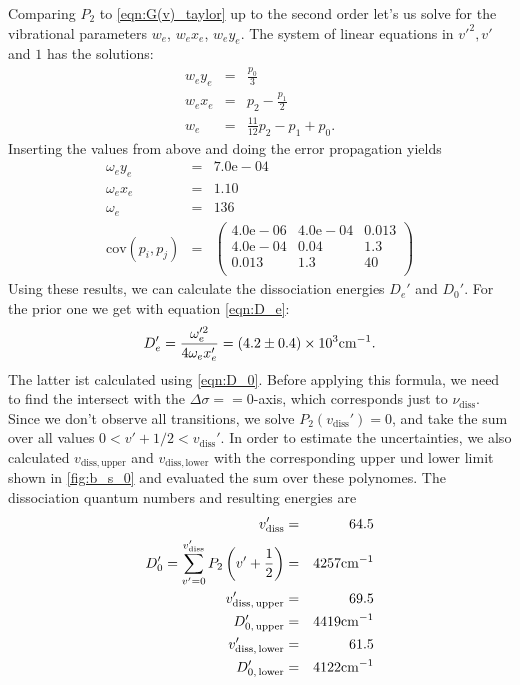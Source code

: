 Comparing $P_2$ to \eqref{eqn:G(v)_taylor} up to the second order let's us solve for 
the vibrational parameters $w_e$, $w_e x_e$, $w_e y_e$. The system of linear equations in 
${v'}^2, v'$ and $1$ has the solutions:
\begin{eqnarray}
    w_e y_e &=& \frac{p_0}{3} \\
    w_e x_e &=& p_2 - \frac{p_1}{2} \\
    w_e &=& \frac{11}{12}p_2 - p_1 + p_0.
\end{eqnarray}
Inserting the values from above and doing the error propagation yields 
\begin{eqnarray}
    \omega_e y_e &=& 7.0\mathrm{e}-04 \\
    \omega_e x_e &=&1.10 \\
    \omega_e &=& 136 \\
    \mathrm{cov}(p_i, p_j) &=& 
    \begin{pmatrix}
        4.0\mathrm{e}-06 &4.0\mathrm{e}-04 &0.013 \\
        4.0\mathrm{e}-04 &0.04 &1.3 \\
        0.013 &1.3 & 40 \\
    \end{pmatrix}
\end{eqnarray} 
Using these results, we can calculate the dissociation energies $D_e'$ and $D_0'$. For the 
prior one we get with equation \eqref{eqn:D_e}:
\begin{eqnarray}
    D_e' = \frac{ \omega_e'^2}{ 4  \omega_e x_e'} =\left(4.2 \pm 0.4\right) \times 10^{3} \mathrm{cm^{-1}}.
\end{eqnarray}
The latter ist calculated using \ref{eqn:D_0}. Before applying this formula, we need to find 
the intersect with the $\Delta \sigma == 0$-axis, which corresponds just to 
$\nu_\mathrm{diss}$. Since we don't observe all transitions, we solve $P_2(v_\mathrm{diss}') = 0$, and 
take the sum over all values $0 < v' + 1/2 < v_\mathrm{diss}'$. In order to estimate the 
uncertainties, we also calculated $v_\mathrm{diss, upper}$ and  $v_\mathrm{diss, lower}$ with 
the corresponding upper und lower limit shown in \ref{fig:b_s_0} and evaluated the sum over 
these polynomes. The dissociation quantum numbers and resulting energies are 
\begin{eqnarray}
    v_\mathrm{diss}' &=& 64.5 \\
    D_0' = \sum_{v' = 0 }^{v'_\mathrm{diss}} P_2 \left (v' + \frac{1}{2} \right ) &=& 4257 \mathrm{cm^{-1}} \\
    v_\mathrm{diss,\, upper}' &=& 69.5 \\
    D_{0,\, \mathrm{upper}}' &=& 4419 \mathrm{cm^{-1}}\\
    v_\mathrm{diss,\, lower}' &=& 61.5 \\
    D_{0,\, \mathrm{lower}}' &=& 4122 \mathrm{cm^{-1}}
\end{eqnarray}






